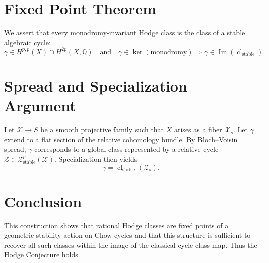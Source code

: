 \documentclass[11pt]{article}
\begin{document}
\section{Fixed Point Theorem}

We assert that every monodromy-invariant Hodge class is the class of a stable algebraic cycle:
\[
\gamma \in H^{p,p}(X) \cap H^{2p}(X, \mathbb{Q}) \quad \text{and} \quad \gamma \in \ker(\text{monodromy})
\Rightarrow
\gamma \in \operatorname{Im}(\operatorname{cl}_{\mathrm{stable}}).
\]

\section{Spread and Specialization Argument}

Let \( \mathcal{X} \to S \) be a smooth projective family such that \( X \) arises as a fiber \( \mathcal{X}_s \). Let \( \gamma \) extend to a flat section of the relative cohomology bundle. By Bloch--Voisin spread, \( \gamma \) corresponds to a global class represented by a relative cycle \( \mathcal{Z} \in \mathcal{Z}^p_{\mathrm{stable}}(\mathcal{X}) \). Specialization then yields
\[
\gamma = \operatorname{cl}_{\mathrm{stable}}(\mathcal{Z}_s).
\]

\section{Conclusion}

This construction shows that rational Hodge classes are fixed points of a geometric-stability action on Chow cycles and that this structure is sufficient to recover all such classes within the image of the classical cycle class map. Thus the Hodge Conjecture holds.
\end{document}
